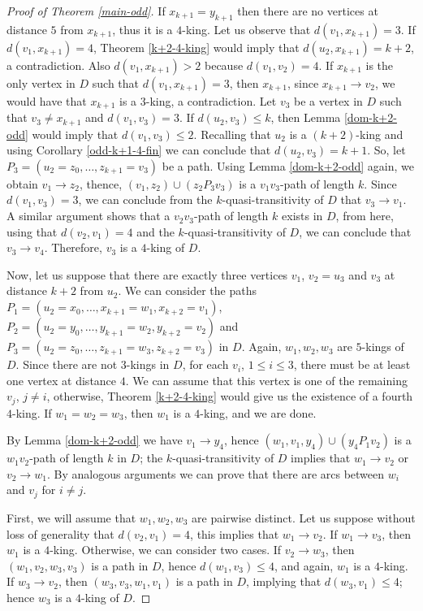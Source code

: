 \documentclass[preprint]{elsarticle}
\begin{document}
\begin{proof}[Proof of Theorem \ref{main-odd}]
	If $x_{k+1} = y_{k+1}$ then there are no vertices at distance $5$ from $x_{k+1}$, thus it is a $4$-king.   Let us observe that $d(v_1, x_{k+1}) = 3$.    If $d(v_1, x_{k+1}) = 4$, Theorem \ref{k+2-4-king} would imply that $d(u_2, x_{k+1}) = k+2$, a contradiction.   Also $d(v_1, x_{k+1}) > 2$ because $d(v_1, v_2) = 4$.   If $x_{k+1}$ is the only vertex in $D$ such that $d(v_1, x_{k+1}) = 3$, then $x_{k+1}$, since $x_{k+1} \to v_2$, we would have that $x_{k+1}$ is a $3$-king, a contradiction.   Let $v_3$ be a vertex in $D$ such that $v_3 \ne x_{k+1}$ and $d(v_1, v_3) = 3$.   If $d(u_2, v_3) \le k$, then Lemma \ref{dom-k+2-odd} would imply that $d(v_1, v_3) \le 2$.   Recalling that $u_2$ is a $(k+2)$-king and using Corollary \ref{odd-k+1-4-fin} we can conclude that $d(u_2, v_3) = k+1$.  So, let $P_3 = (u_2 = z_0, \dots, z_{k+1} = v_3)$ be a path.   Using Lemma \ref{dom-k+2-odd} again, we obtain $v_1 \to z_2$, thence, $(v_1, z_2) \cup (z_2 P_3 v_3)$ is a $v_1 v_3$-path of length $k$.   Since $d(v_1, v_3) = 3$, we can conclude from the $k$-quasi-transitivity of $D$ that $v_3 \to v_1$.   A similar argument shows that a $v_2 v_3$-path of length $k$ exists in $D$, from here, using that $d(v_2, v_1) = 4$ and the $k$-quasi-transitivity of $D$, we can conclude that $v_3 \to v_4$.   Therefore, $v_3$ is a $4$-king of $D$.
	
	Now, let us suppose that there are exactly three vertices $v_1$, $v_2 = u_3$ and $v_3$ at distance $k+2$ from $u_2$.   We can consider the paths $P_1 = (u_2 = x_0, \dots, x_{k+1} = w_1, x_{k+2}=v_1)$, $P_2 = (u_2 = y_0, \dots, y_{k+1} = w_2, y_{k+2}=v_2)$ and $P_3 = (u_2 = z_0, \dots, z_{k+1} = w_3, z_{k+2}=v_3)$ in $D$.   Again, $w_1, w_2, w_3$ are $5$-kings of $D$.   Since there are not $3$-kings in $D$, for each $v_i$, $1 \le i \le 3$, there must be at least one vertex at distance $4$.   We can assume that this vertex is one of the remaining $v_j$, $j \ne i$, otherwise, Theorem \ref{k+2-4-king} would give us the existence of a fourth $4$-king.   If $w_1 = w_2 = w_3$, then $w_1$ is a $4$-king, and we are done.
	
	By Lemma \ref{dom-k+2-odd} we have $v_1 \to y_4$, hence $(w_1, v_1, y_4) \cup (y_4 P_1 v_2)$ is a $w_1 v_2$-path of length $k$ in $D$; the $k$-quasi-transitivity of $D$ implies that $w_1 \to v_2$ or $v_2 \to w_1$.   By analogous arguments we can prove that there are arcs between $w_i$ and $v_j$ for $i \ne j$. 
	
	First, we will assume that $w_1, w_2, w_3$ are pairwise distinct.   Let us suppose without loss of generality that $d(v_2, v_1) = 4$, this implies that $w_1 \to v_2$.   If $w_1 \to v_3$, then $w_1$ is a $4$-king.   Otherwise, we can consider two cases.   If $v_2 \to w_3$, then $(w_1, v_2, w_3, v_3)$ is a path in $D$, hence $d(w_1, v_3) \le 4$, and again, $w_1$ is a $4$-king.   If $w_3 \to v_2$, then $(w_3, v_3, w_1, v_1)$ is a path in $D$, implying that $d(w_3, v_1) \le 4$; hence $w_3$ is a $4$-king of $D$.
	

\end{proof}
\end{document}
